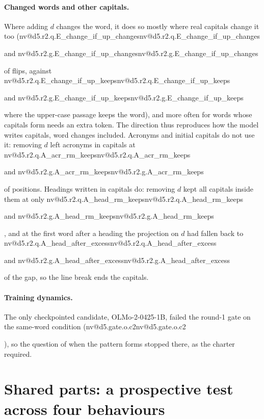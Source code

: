 \documentclass[11pt]{article}
\makeatletter
\newcommand{\nv}[1]{\ifcsname nv@#1\endcsname\csname nv@#1\endcsname\else\PackageError{numbers}{Unknown number key #1}{}\fi}
\newcommand{\olmo}{OLMo-2-0425-1B}
\newcommand{\DRQ}[1]{\nv{d5.r2.q.#1}}
\newcommand{\DRG}[1]{\nv{d5.r2.g.#1}}
\makeatother
\begin{document}
\paragraph{Changed words and other capitals.} Where adding $d$ changes the word, it does so mostly where real capitals change it too (\DRQ{E_change_if_up_changes} and \DRG{E_change_if_up_changes} of flips, against \DRQ{E_change_if_up_keeps} and \DRG{E_change_if_up_keeps} where the upper-case passage keeps the word), and more often for words whose capitals form needs an extra token. The direction thus reproduces how the model writes capitals, word changes included. Acronyms and initial capitals do not use it: removing $d$ left acronyms in capitals at \DRQ{A_acr_rm_keeps} and \DRG{A_acr_rm_keeps} of positions. Headings written in capitals do: removing $d$ kept all capitals inside them at only \DRQ{A_head_rm_keeps} and \DRG{A_head_rm_keeps}, and at the first word after a heading the projection on $d$ had fallen back to \DRQ{A_head_after_excess} and \DRG{A_head_after_excess} of the gap, so the line break ends the capitals.

\paragraph{Training dynamics.} The only checkpointed candidate, \olmo{}, failed the round-1 gate on the same-word condition (\nv{d5.gate.o.c2}), so the question of when the pattern forms stopped there, as the charter required.

\section{Shared parts: a prospective test across four behaviours}
\label{sec:x1}
\end{document}
